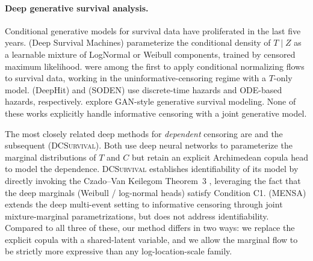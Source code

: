 \paragraph{Deep generative survival analysis.}
Conditional generative models for survival data have proliferated in the
last five years. \citet{nagpal2021dsm} (Deep Survival Machines) parameterize
the conditional density of $T \mid Z$ as a learnable mixture of LogNormal or
Weibull components, trained by censored maximum likelihood. \citet{ausset2021conditional}
were among the first to apply conditional normalizing flows to survival data,
working in the uninformative-censoring regime with a $T$-only model.
\citet{lee2018deephit} (DeepHit) and \citet{tang2022soden} (SODEN) use
discrete-time hazards and ODE-based hazards, respectively. \citet{norcliffe2023survivalgan}
explore GAN-style generative survival modeling. None of these works explicitly
handle informative censoring with a joint generative model.

The most closely related deep methods for \emph{dependent} censoring are
\citet{ding2023copula} and the subsequent \citet{zhang2024deepcopula}
(\textsc{DCSurvival}). Both use deep neural networks to parameterize the
marginal distributions of $T$ and $C$ but retain an explicit Archimedean
copula head to model the dependence. \textsc{DCSurvival} establishes
identifiability of its model by directly invoking the Czado--Van Keilegom
Theorem~3 \citep{czado2023dependent}, leveraging the fact that the deep
marginals (Weibull / log-normal heads) satisfy Condition C1. \citet{lillelund2024mensa}
(\textsc{MENSA}) extends the deep multi-event setting to informative censoring
through joint mixture-marginal parametrizations, but does not address
identifiability. Compared to all three of these, our method differs in two
ways: we replace the explicit copula with a shared-latent variable, and we
allow the marginal flow to be strictly more expressive than any
log-location-scale family.

